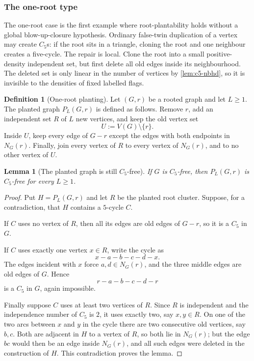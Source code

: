\documentclass[11pt]{article}
\newtheorem{lemma}[lemma]{Lemma}
\theoremstyle{definition}
\newtheorem{definition}[definition]{Definition}
\begin{document}
\subsubsection{The one-root type}

The one-root case is the first example where root-plantability holds without a
global blow-up-closure hypothesis.  Ordinary false-twin duplication of a vertex may create $C_5$s:
if the root sits in a triangle, cloning the root and one neighbour creates a
five-cycle.  The repair is local.  Clone the root into a small positive-density
independent set, but first delete all old edges inside its neighbourhood.  The
deleted set is only linear in the number of vertices by \cref{lem:c5-nbhd}, so
it is invisible to the densities of fixed labelled flags.

\begin{definition}[One-root planting]\label{def:c5-one-root-planting}
Let $(G,r)$ be a rooted graph and let $L\ge1$.  The planted graph
$P_L(G,r)$ is defined as follows.  Remove $r$, add an independent set $R$ of
$L$ new vertices, and keep the old vertex set
\[
  U:=V(G)\setminus\{r\}.
\]
Inside $U$, keep every edge of $G-r$ except the edges with both endpoints in
$N_G(r)$.  Finally, join every vertex of $R$ to every vertex of $N_G(r)$, and
to no other vertex of $U$.
\end{definition}

\begin{lemma}[The planted graph is still $C_5$-free]\label{lem:c5-planting-free}
If $G$ is $C_5$-free, then $P_L(G,r)$ is $C_5$-free for every $L\ge1$.
\end{lemma}

\begin{proof}
Put $H=P_L(G,r)$ and let $R$ be the planted root cluster.  Suppose, for a
contradiction, that $H$ contains a $5$-cycle $C$.

If $C$ uses no vertex of $R$, then all its edges are old edges of $G-r$, so it
is a $C_5$ in $G$.

If $C$ uses exactly one vertex $x\in R$, write the cycle as
\[
  x-a-b-c-d-x.
\]
The edges incident with $x$ force $a,d\in N_G(r)$, and the three middle edges
are old edges of $G$.  Hence
\[
  r-a-b-c-d-r
\]
is a $C_5$ in $G$, again impossible.

Finally suppose $C$ uses at least two vertices of $R$.  Since $R$ is
independent and the independence number of $C_5$ is $2$, it uses exactly two,
say $x,y\in R$.  On one of the two arcs between $x$ and $y$ in the cycle there
are two consecutive old vertices, say $b,c$.  Both are adjacent in $H$ to a
vertex of $R$, so both lie in $N_G(r)$; but the edge $bc$ would then be an edge
inside $N_G(r)$, and all such edges were deleted in the construction of $H$.
This contradiction proves the lemma.
\end{proof}
\end{document}
